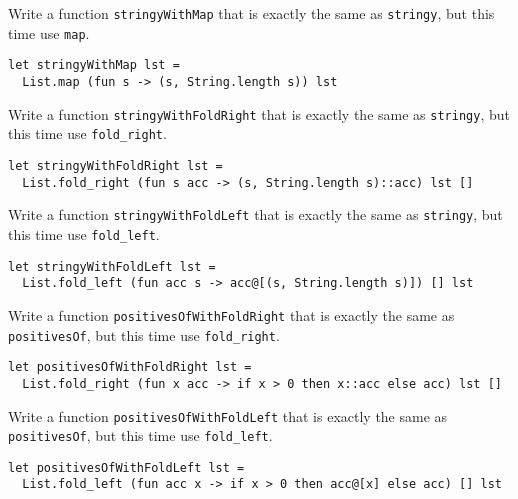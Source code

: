 \documentclass[addpoints]{exam}
\begin{document}
\begin{questions}
  \question 
  Write a function \texttt{stringyWithMap}
  that is exactly the same as \texttt{stringy},
  but this time use \texttt{map}.

  \begin{solutionbox}{2cm}
    \begin{verbatim}
let stringyWithMap lst =
  List.map (fun s -> (s, String.length s)) lst
    \end{verbatim}
  \end{solutionbox}

  
  \question 
  Write a function \texttt{stringyWithFoldRight}
  that is exactly the same as \texttt{stringy},
  but this time use \texttt{fold\_right}.

  \begin{solutionbox}{2cm}
    \begin{verbatim}
let stringyWithFoldRight lst =
  List.fold_right (fun s acc -> (s, String.length s)::acc) lst []
    \end{verbatim}
  \end{solutionbox}

  
  \question 
  Write a function \texttt{stringyWithFoldLeft}
  that is exactly the same as \texttt{stringy},
  but this time use \texttt{fold\_left}.

  \begin{solutionbox}{2cm}
    \begin{verbatim}
let stringyWithFoldLeft lst =
  List.fold_left (fun acc s -> acc@[(s, String.length s)]) [] lst
    \end{verbatim}
  \end{solutionbox}

  
  \question 
  Write a function \texttt{positivesOfWithFoldRight}
  that is exactly the same as \texttt{positivesOf},
  but this time use \texttt{fold\_right}.

  \begin{solutionbox}{2cm}
    \begin{verbatim}
let positivesOfWithFoldRight lst =
  List.fold_right (fun x acc -> if x > 0 then x::acc else acc) lst []
    \end{verbatim}
  \end{solutionbox}

  
  \question 
  Write a function \texttt{positivesOfWithFoldLeft}
  that is exactly the same as \texttt{positivesOf},
  but this time use \texttt{fold\_left}.

  \begin{solutionbox}{2cm}
    \begin{verbatim}
let positivesOfWithFoldLeft lst =
  List.fold_left (fun acc x -> if x > 0 then acc@[x] else acc) [] lst
    \end{verbatim}
  \end{solutionbox}


\end{questions}
\end{document}
